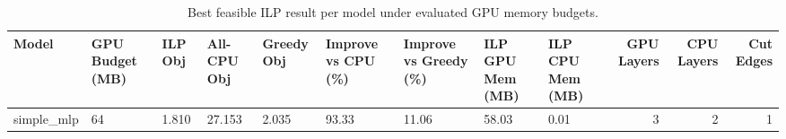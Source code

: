 \begin{table}[t]
\centering
\caption{Best feasible ILP result per model under evaluated GPU memory budgets.}
\label{tab:ilp-best-per-model}
\begin{tabular}{lllllllllrrr}
\toprule
Model & GPU Budget (MB) & ILP Obj & All-CPU Obj & Greedy Obj & Improve vs CPU (\%) & Improve vs Greedy (\%) & ILP GPU Mem (MB) & ILP CPU Mem (MB) & GPU Layers & CPU Layers & Cut Edges \\
\midrule
simple_mlp & 64 & 1.810 & 27.153 & 2.035 & 93.33 & 11.06 & 58.03 & 0.01 & 3 & 2 & 1 \\
\bottomrule
\end{tabular}

\end{table}
